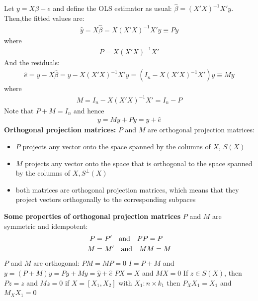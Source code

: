 \documentclass[a4paper,twoside,11pt]{article}
\begin{document}
\begin{shaded*}
Let $y= X\beta + e$ and define the OLS estimator as usual: $\hat{\beta}= (X'X)^{-1}X'y$. Then,the fitted values are:
\begin{equation*}
\begin{aligned}
\hat{y} = X \hat{\beta} = X(X'X)^{-1} X'y \equiv Py 
\end{aligned}
\end{equation*}
where 
\begin{equation*}
\begin{aligned}
P = X(X'X)^{-1} X'
\end{aligned}
\end{equation*}
And the residuals:
\begin{equation*}
\begin{aligned}
\hat{e} = y - X \hat{\beta} = y- X(X'X)^{-1} X' y = (I_n - X(X'X)^{-1} X')y \equiv My
\end{aligned}
\end{equation*}
where
\begin{equation*}
\begin{aligned}
M = I_n - X(X'X)^{-1} X' = I_n - P
\end{aligned}
\end{equation*}
Note that $P+M=I_n$ and hence
\begin{equation*}
\begin{aligned}
y = My + Py = \hat{y} + \hat{e}
\end{aligned}
\end{equation*}
\textbf{Orthogonal projection matrices:}
\newline
$P$ and $M$ are orthogonal projection matrices:
\begin{itemize}
    \item $P$ projects any vector onto the space spanned by the columns of $X$, $S(X)$ 
    \item $M$ projects any vector onto the space that is orthogonal to the space
spanned by the columns of $X, S^\perp (X)$
    \item both matrices are orthogonal projection matrices, which means that they project vectors orthogonally to the corresponding subpaces
\end{itemize}
\textbf{Some properties of orthogonal projection matrices}
\newline
$P$ and $M$ are symmetric and idempotent:
\begin{equation*}
\begin{aligned}
P =& \  P' \ \ \ \textmd{and} \ \ \ PP=P \\
M =& \  M' \ \ \ \textmd{and} \ \ \ MM=M
\end{aligned}
\end{equation*}
$P$ and $M$ are orthogonal: $PM = MP = 0$ 
\newline
$I = P + M$ and $y= (P+M)y = Py+My = \hat{y} + \hat{e}$
\newline
$PX=X$ and $MX = 0$ 
\newline
If $z \in S(X)$, then $Pz=z$ and $Mz = 0$
\newline
if $X = [X_1, X_2]$ with $X_1: n \times k_1$ then $P_X X_1 = X_1$ and $M_X X_1 =0$
\end{shaded*}
\end{document}
